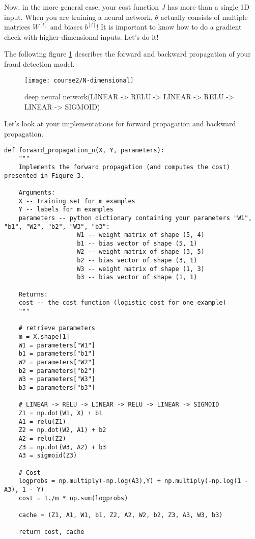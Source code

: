 Now, in the more general case, your cost function $J$ has more than a single 1D input. When you are training a neural network, $\theta$ actually consists of multiple matrices $W^{[l]}$ and biases $b^{[l]}$! It is important to know how to do a gradient check with higher-dimensional inputs. Let's do it!



The following figure \ref{N-dimensional} describes the forward and backward propagation of your fraud detection model.
\clearpage
\begin{figure}[h]
\begin{center}
\texttt{[image: course2/N-dimensional]}
\caption{deep neural network(LINEAR -> RELU -> LINEAR -> RELU -> LINEAR -> SIGMOID)}
\label{N-dimensional}
\end{center}
\end{figure}

Let's look at your implementations for forward propagation and backward propagation.

\begin{verbatim}
def forward_propagation_n(X, Y, parameters):
    """
    Implements the forward propagation (and computes the cost) presented in Figure 3.
    
    Arguments:
    X -- training set for m examples
    Y -- labels for m examples 
    parameters -- python dictionary containing your parameters "W1", "b1", "W2", "b2", "W3", "b3":
                    W1 -- weight matrix of shape (5, 4)
                    b1 -- bias vector of shape (5, 1)
                    W2 -- weight matrix of shape (3, 5)
                    b2 -- bias vector of shape (3, 1)
                    W3 -- weight matrix of shape (1, 3)
                    b3 -- bias vector of shape (1, 1)
    
    Returns:
    cost -- the cost function (logistic cost for one example)
    """
    
    # retrieve parameters
    m = X.shape[1]
    W1 = parameters["W1"]
    b1 = parameters["b1"]
    W2 = parameters["W2"]
    b2 = parameters["b2"]
    W3 = parameters["W3"]
    b3 = parameters["b3"]

    # LINEAR -> RELU -> LINEAR -> RELU -> LINEAR -> SIGMOID
    Z1 = np.dot(W1, X) + b1
    A1 = relu(Z1)
    Z2 = np.dot(W2, A1) + b2
    A2 = relu(Z2)
    Z3 = np.dot(W3, A2) + b3
    A3 = sigmoid(Z3)

    # Cost
    logprobs = np.multiply(-np.log(A3),Y) + np.multiply(-np.log(1 - A3), 1 - Y)
    cost = 1./m * np.sum(logprobs)
    
    cache = (Z1, A1, W1, b1, Z2, A2, W2, b2, Z3, A3, W3, b3)
    
    return cost, cache
\end{verbatim}

